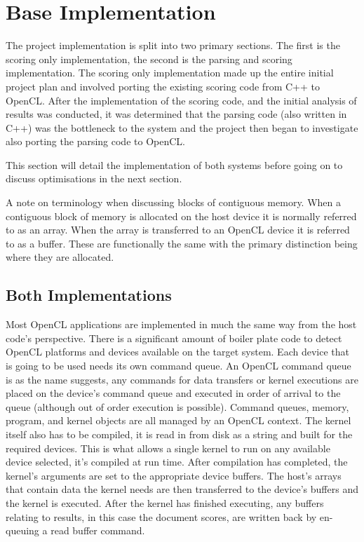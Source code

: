 \section{Base Implementation}

The project implementation is split into two primary sections. The first is the
scoring only implementation, the second is the parsing and scoring
implementation. The scoring only implementation made up the entire initial
project plan and involved porting the existing scoring code from C++ to OpenCL.
After the implementation of the scoring code, and the initial analysis of
results was conducted, it was determined that the parsing code (also written in
C++) was the bottleneck to the system and the project then began to investigate
also porting the parsing code to OpenCL.

This section will detail the implementation of both systems before going on to
discuss optimisations in the next section.

A note on terminology when discussing blocks of contiguous memory. When a
contiguous block of memory is allocated on the host device it is normally
referred to as an array. When the array is transferred to an OpenCL device it is
referred to as a buffer. These are functionally the same with the primary
distinction being where they are allocated.

\subsection{Both Implementations}

Most OpenCL applications are implemented in much the same way from the host
code's perspective. There is a significant amount of boiler plate code to detect
OpenCL platforms and devices available on the target system. Each device that is
going to be used needs its own command queue. An OpenCL command queue is as the
name suggests, any commands for data transfers or kernel executions are placed
on the device's command queue and executed in order of arrival to the queue
(although out of order execution is possible). Command queues, memory, program,
and kernel objects are all managed by an OpenCL context. The kernel itself also
has to be compiled, it is read in from disk as a string and built for the
required devices. This is what allows a single kernel to run on any available
device selected, it's compiled at run time. After compilation has completed, the
kernel's arguments are set to the appropriate device buffers. The host's arrays
that contain data the kernel needs are then transferred to the device's buffers
and the kernel is executed. After the kernel has finished executing, any buffers
relating to results, in this case the document scores, are written back by en-
queuing a read buffer command.

